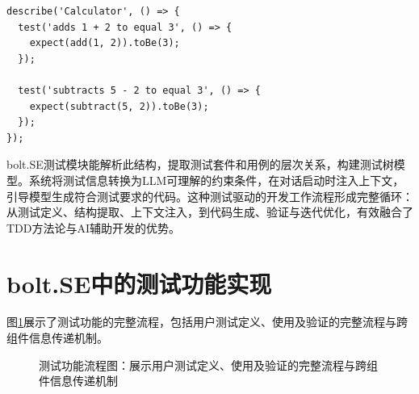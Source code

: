 \begin{verbatim}
describe('Calculator', () => {
  test('adds 1 + 2 to equal 3', () => {
    expect(add(1, 2)).toBe(3);
  });
  
  test('subtracts 5 - 2 to equal 3', () => {
    expect(subtract(5, 2)).toBe(3);
  });
});
\end{verbatim}

bolt.SE测试模块能解析此结构，提取测试套件和用例的层次关系，构建测试树模型。系统将测试信息转换为LLM可理解的约束条件，在对话启动时注入上下文，引导模型生成符合测试要求的代码。这种测试驱动的开发工作流程形成完整循环：从测试定义、结构提取、上下文注入，到代码生成、验证与迭代优化，有效融合了TDD方法论与AI辅助开发的优势。

\section{bolt.SE中的测试功能实现}

图\ref{fig:test_sequence}展示了测试功能的完整流程，包括用户测试定义、使用及验证的完整流程与跨组件信息传递机制。

\begin{figure}[H]
  \centering
  \caption{测试功能流程图：展示用户测试定义、使用及验证的完整流程与跨组件信息传递机制}
  \label{fig:test_sequence}
\end{figure}

